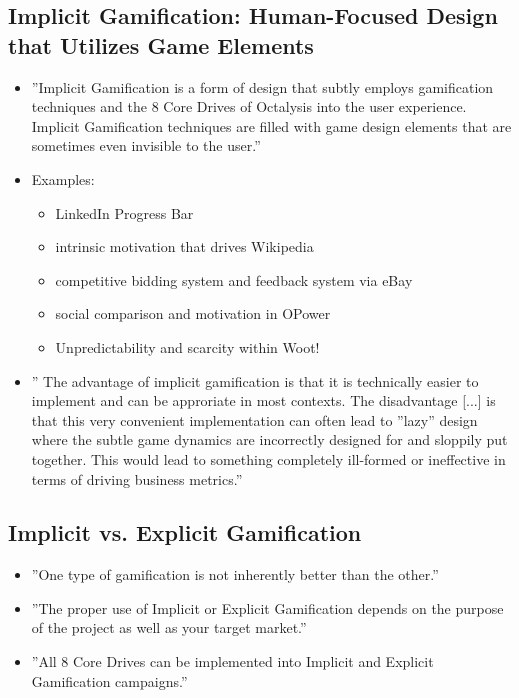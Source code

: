 \subsection{Implicit Gamification: Human-Focused Design that Utilizes Game Elements}
\begin{itemize}
    \item ''Implicit Gamification is a form of design that subtly employs gamification techniques and the 8 Core Drives of Octalysis into the user experience. Implicit Gamification techniques are filled with game design elements that are sometimes even invisible to the user.''
    \item Examples:
    \begin{itemize}
        \item LinkedIn Progress Bar
        \item intrinsic motivation that drives Wikipedia
        \item competitive bidding system and feedback system via eBay
        \item social comparison and motivation in OPower
        \item Unpredictability and scarcity within Woot!
    \end{itemize}
    \item '' The advantage of implicit gamification is that it is technically easier to implement and can be approriate in most contexts. The disadvantage [...] is that this very convenient implementation can often lead to ''lazy'' design where the subtle game dynamics are incorrectly designed for and sloppily put together. This would lead to something completely ill-formed or ineffective in terms of driving business metrics.''
\end{itemize}

\subsection{Implicit vs. Explicit Gamification}
\begin{itemize}
    \item ''One type of gamification is not inherently better than the other.''
    \item ''The proper use of Implicit or Explicit Gamification depends on the purpose of the project as well as your target market.''
    \item ''All 8 Core Drives can be implemented into Implicit and Explicit Gamification campaigns.''
\end{itemize}